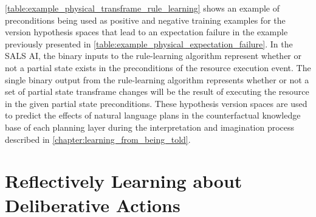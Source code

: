 {\mbox{\autoref{table:example_physical_transframe_rule_learning}}}
shows an example of preconditions being used as positive and negative
training examples for the version hypothesis spaces that lead to an
expectation failure in the example previously presented in
{\mbox{\autoref{table:example_physical_expectation_failure}}}.  In the
SALS AI, the binary inputs to the rule-learning algorithm represent
whether or not a partial state exists in the preconditions of the
resource execution event.  The single binary output from the
rule-learning algorithm represents whether or not a set of partial
state transframe changes will be the result of executing the resource
in the given partial state preconditions.  These hypothesis version
spaces are used to predict the effects of natural language plans in
the counterfactual knowledge base of each planning layer during the
interpretation and imagination process described in
{\mbox{\autoref{chapter:learning_from_being_told}}}.

\section{Reflectively Learning about Deliberative Actions}

